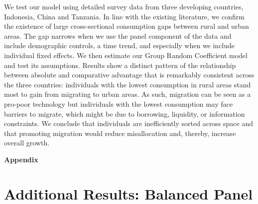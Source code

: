 \documentclass[12pt]{article}
\begin{document}
We test our model using detailed survey data from three developing countries, Indonesia, China and Tanzania. In line with the existing literature, we confirm the existence of large cross-sectional consumption gaps between rural and urban areas. The gap narrows when we use the panel component of the data and include demographic controls, a time trend, and especially when we include individual fixed effects. 
We then estimate our Group Random Coefficient model and test its assumptions. 
Results show a distinct pattern of the relationship between absolute and comparative advantage that is remarkably consistent across the three countries: individuals with the lowest consumption in rural areas stand most to gain from migrating to urban areas. 
As such, migration can be seen as a pro-poor technology but individuals with the lowest consumption may face barriers to migrate, which might be due to borrowing, liquidity, or information constraints. 
We conclude that individuals are inefficiently sorted across space and that promoting migration would reduce misallocation and, thereby, increase overall growth. 


\newpage
% 


\newpage
\appendix
\onehalfspacing


\renewcommand\thefigure{\thesection.\arabic{figure}}
\setcounter{figure}{0}

\renewcommand\thetable{\thesection.\arabic{table}}
\setcounter{table}{0}
\begin{center}\textbf{\huge{Appendix}}\end{center}







\section{Additional Results: Balanced Panel}\label{app:balanced_panel}




\begin{landscape}
     
\end{landscape}
% 
% 
% 
\end{document}
